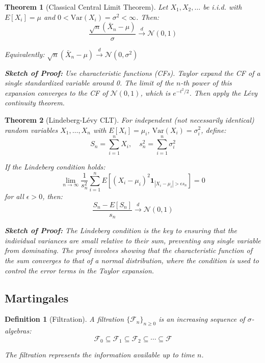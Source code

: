 \documentclass[12pt,a4paper]{article}
\newtheorem{theorem}{Theorem}[section]
\newtheorem{definition}{Definition}[section]
\theoremstyle{remark}
\begin{document}
\begin{theorem}[Classical Central Limit Theorem]
Let $X_1, X_2, \ldots$ be i.i.d. with $E[X_i] = \mu$ and $0 < \text{Var}(X_i) = \sigma^2 < \infty$. Then:
$$\frac{\sqrt{n}(\bar{X}_n - \mu)}{\sigma} \stackrel{d}{\to} \mathcal{N}(0,1)$$

Equivalently: $\sqrt{n}(\bar{X}_n - \mu) \stackrel{d}{\to} \mathcal{N}(0, \sigma^2)$

\textbf{Sketch of Proof:} Use characteristic functions (CFs). Taylor expand the CF of a single standardized variable around 0. The limit of the $n$-th power of this expansion converges to the CF of $\mathcal{N}(0,1)$, which is $e^{-t^2/2}$. Then apply the Lévy continuity theorem.
\end{theorem}

\begin{theorem}[Lindeberg-Lévy CLT]
For independent (not necessarily identical) random variables $X_1, \ldots, X_n$ with $E[X_i] = \mu_i$, $\text{Var}(X_i) = \sigma_i^2$, define:
$$S_n = \sum_{i=1}^n X_i, \quad s_n^2 = \sum_{i=1}^n \sigma_i^2$$

If the Lindeberg condition holds:
$$\lim_{n \to \infty} \frac{1}{s_n^2} \sum_{i=1}^n E[(X_i - \mu_i)^2 \mathbf{1}_{|X_i - \mu_i| > \epsilon s_n}] = 0$$
for all $\epsilon > 0$, then:
$$\frac{S_n - E[S_n]}{s_n} \stackrel{d}{\to} \mathcal{N}(0,1)$$

\textbf{Sketch of Proof:} The Lindeberg condition is the key to ensuring that the individual variances are small relative to their sum, preventing any single variable from dominating. The proof involves showing that the characteristic function of the sum converges to that of a normal distribution, where the condition is used to control the error terms in the Taylor expansion.
\end{theorem}

\subsection{Martingales}

\begin{definition}[Filtration]
A filtration $\{\mathcal{F}_n\}_{n \geq 0}$ is an increasing sequence of $\sigma$-algebras:
$$\mathcal{F}_0 \subseteq \mathcal{F}_1 \subseteq \mathcal{F}_2 \subseteq \cdots \subseteq \mathcal{F}$$

The filtration represents the information available up to time $n$.
\end{definition}
\end{document}
